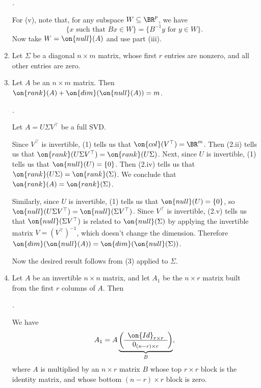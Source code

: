 \documentclass[10pt]{amsart}
\makeatletter
\renewenvironment{proof}[1][\proofname]{\par
	\pushQED{\qed}%
	\normalfont \topsep6\p@\@plus6\p@\relax
	\noindent\emph{#1.} 
	\ignorespaces
}{%
\popQED\endtrivlist\@endpefalse
}
\theoremstyle{mythm}
\theoremstyle{definition}
\theoremstyle{myrmk}
\newenvironment{myproof}{\color{blue}\begin{proof}}{\end{proof}}
\makeatother
\begin{document}
\begin{enumerate}[label=(\arabic*)]
\begin{myproof}
			For (v), note that, for any subspace $W \subseteq \BR^p$, we have 
			\[
			\{x \text{ such that } Bx \in W\} = \{B^{-1}y \text{ for } y \in W\}. 
			\]
			Now take $W = \on{null}(A)$ and use part (iii). 
		\end{myproof}
		\item Let $\Sigma$ be a diagonal $n \times m$ matrix, whose first $r$ entries are nonzero, and all other entries are zero. 
		\item Let $A$ be an $n \times m$ matrix. Then $\on{rank}(A) + \on{dim}(\on{null}(A)) = m$. 
		\begin{myproof}
			Let $A = U \Sigma V^\top$ be a full SVD. 
			
			Since $V^\top$ is invertible, (1) tells us that $\on{col}(V^\top) = \BR^m$. Then (2.ii) tells us that $\on{rank}(U\Sigma V^\top) = \on{rank}(U\Sigma)$. Next, since $U$ is invertible, (1) tells us that $\on{null}(U) = \{0\}$. Then (2.iv) tells us that $\on{rank}(U \Sigma) = \on{rank}(\Sigma)$. We conclude that $\on{rank}(A) = \on{rank}(\Sigma)$. 
			
			Similarly, since $U$ is invertible, (1) tells us that $\on{null}(U) = \{0\}$, so $\on{null}(U \Sigma V^\top) = \on{null}(\Sigma V^\top)$. Since $V^\top$ is invertible, (2.v) tells us that $\on{null}(\Sigma V^\top)$ is related to $\on{null}(\Sigma)$ by applying the invertible matrix $V = (V^\top)^{-1}$, which doesn't change the dimension. Therefore $\on{dim}(\on{null}(A)) = \on{dim}(\on{null}(\Sigma))$. 
			
			Now the desired result follows from (3) applied to $\Sigma$. 
		\end{myproof}
		\item Let $A$ be an invertible $n \times n$ matrix, and let $A_1$ be the $n \times r$ matrix built from the first $r$ columns of $A$. Then 
		\begin{myproof}
			We have 
			\[
			A_1 = A \underbrace{\left( \begin{array}{c} \on{Id}_{r \times r} \\ \hline 0_{(n-r) \times r}\end{array} \right)}_B, 
			\]
			where $A$ is multiplied by an $n \times r$ matrix $B$ whose top $r \times r$ block is the identity matrix, and whose bottom $(n-r) \times r$ block is zero. 
			

\end{myproof}
\end{enumerate}
\end{document}
